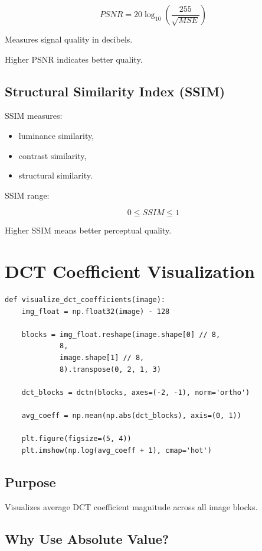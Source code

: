 \documentclass[12pt,a4paper]{article}
\begin{document}
\[
PSNR = 20\log_{10}\left(\frac{255}{\sqrt{MSE}}\right)
\]

Measures signal quality in decibels.

Higher PSNR indicates better quality.

\subsection{Structural Similarity Index (SSIM)}

SSIM measures:
\begin{itemize}
    \item luminance similarity,
    \item contrast similarity,
    \item structural similarity.
\end{itemize}

SSIM range:

\[
0 \leq SSIM \leq 1
\]

Higher SSIM means better perceptual quality.

\section{DCT Coefficient Visualization}

\begin{lstlisting}
def visualize_dct_coefficients(image):
    img_float = np.float32(image) - 128

    blocks = img_float.reshape(image.shape[0] // 8,
             8,
             image.shape[1] // 8,
             8).transpose(0, 2, 1, 3)

    dct_blocks = dctn(blocks, axes=(-2, -1), norm='ortho')

    avg_coeff = np.mean(np.abs(dct_blocks), axis=(0, 1))

    plt.figure(figsize=(5, 4))
    plt.imshow(np.log(avg_coeff + 1), cmap='hot')
\end{lstlisting}

\subsection{Purpose}

Visualizes average DCT coefficient magnitude across all image blocks.

\subsection{Why Use Absolute Value?}
\end{document}
